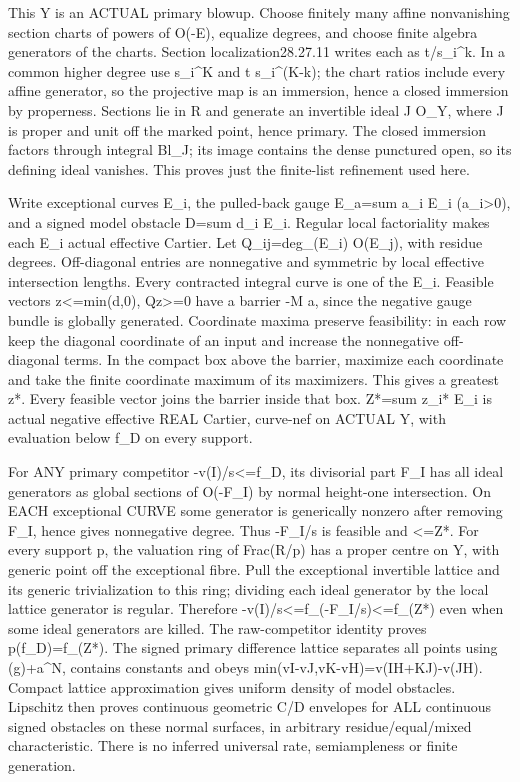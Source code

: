 This Y is an ACTUAL primary blowup. Choose finitely many affine nonvanishing section charts of powers of O(-E), equalize degrees, and choose finite algebra generators of the charts. Section localization28.27.11 writes each as t/s\_i\textasciicircum{}k. In a common higher degree use s\_i\textasciicircum{}K and t s\_i\textasciicircum{}(K-k); the chart ratios include every affine generator, so the projective map is an immersion, hence a closed immersion by properness. Sections lie in R and generate an invertible ideal J O\_Y, where J is proper and unit off the marked point, hence primary. The closed immersion factors through integral Bl\_J; its image contains the dense punctured open, so its defining ideal vanishes. This proves just the finite-list refinement used here.

Write exceptional curves E\_i, the pulled-back gauge E\_a=sum a\_i E\_i (a\_i\textgreater{}0), and a signed model obstacle D=sum d\_i E\_i. Regular local factoriality makes each E\_i actual effective Cartier. Let Q\_ij=deg\_(E\_i) O(E\_j), with residue degrees. Off-diagonal entries are nonnegative and symmetric by local effective intersection lengths. Every contracted integral curve is one of the E\_i. Feasible vectors z\textless{}=min(d,0), Qz\textgreater{}=0 have a barrier -M a, since the negative gauge bundle is globally generated. Coordinate maxima preserve feasibility: in each row keep the diagonal coordinate of an input and increase the nonnegative off-diagonal terms. In the compact box above the barrier, maximize each coordinate and take the finite coordinate maximum of its maximizers. This gives a greatest z*. Every feasible vector joins the barrier inside that box. Z*=sum z\_i* E\_i is actual negative effective REAL Cartier, curve-nef on ACTUAL Y, with evaluation below f\_D on every support.

For ANY primary competitor -v(I)/s\textless{}=f\_D, its divisorial part F\_I has all ideal generators as global sections of O(-F\_I) by normal height-one intersection. On EACH exceptional CURVE some generator is generically nonzero after removing F\_I, hence gives nonnegative degree. Thus -F\_I/s is feasible and \textless{}=Z*. For every support p, the valuation ring of Frac(R/p) has a proper centre on Y, with generic point off the exceptional fibre. Pull the exceptional invertible lattice and its generic trivialization to this ring; dividing each ideal generator by the local lattice generator is regular. Therefore -v(I)/s\textless{}=f\_(-F\_I/s)\textless{}=f\_(Z*) even when some ideal generators are killed. The raw-competitor identity proves p(f\_D)=f\_(Z*). The signed primary difference lattice separates all points using (g)+a\textasciicircum{}N, contains constants and obeys min(vI-vJ,vK-vH)=v(IH+KJ)-v(JH). Compact lattice approximation gives uniform density of model obstacles. Lipschitz then proves continuous geometric C/D envelopes for ALL continuous signed obstacles on these normal surfaces, in arbitrary residue/equal/mixed characteristic. There is no inferred universal rate, semiampleness or finite generation.

